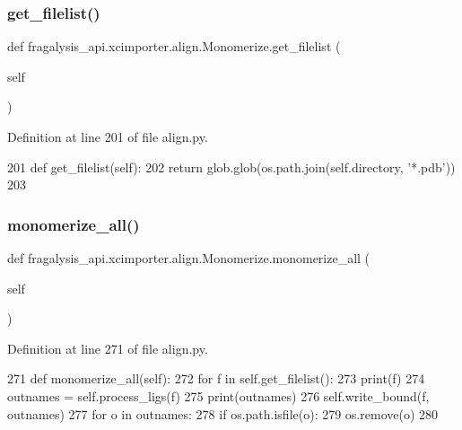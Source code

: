 \subsubsection{\texorpdfstring{get\+\_\+filelist()}{get\_filelist()}}
{\footnotesize\ttfamily def fragalysis\+\_\+api.\+xcimporter.\+align.\+Monomerize.\+get\+\_\+filelist (\begin{DoxyParamCaption}\item[{}]{self }\end{DoxyParamCaption})}



Definition at line 201 of file align.\+py.


\begin{DoxyCode}
201     \textcolor{keyword}{def }get\_filelist(self):
202         \textcolor{keywordflow}{return} glob.glob(os.path.join(self.directory, \textcolor{stringliteral}{'*.pdb'}))
203 
\end{DoxyCode}
\mbox{\label{classfragalysis__api_1_1xcimporter_1_1align_1_1_monomerize_a2418993e78b9269ecc5d4222a142261c}} 
\subsubsection{\texorpdfstring{monomerize\+\_\+all()}{monomerize\_all()}}
{\footnotesize\ttfamily def fragalysis\+\_\+api.\+xcimporter.\+align.\+Monomerize.\+monomerize\+\_\+all (\begin{DoxyParamCaption}\item[{}]{self }\end{DoxyParamCaption})}



Definition at line 271 of file align.\+py.


\begin{DoxyCode}
271     \textcolor{keyword}{def }monomerize\_all(self):
272         \textcolor{keywordflow}{for} f \textcolor{keywordflow}{in} self.get\_filelist():
273             print(f)
274             outnames = self.process\_ligs(f)
275             print(outnames)
276             self.write\_bound(f, outnames)
277             \textcolor{keywordflow}{for} o \textcolor{keywordflow}{in} outnames:
278                 \textcolor{keywordflow}{if} os.path.isfile(o):
279                     os.remove(o)
280 \end{DoxyCode}
\mbox{\label{classfragalysis__api_1_1xcimporter_1_1align_1_1_monomerize_a182c0cf1af3303f6c13d5160c6c0ff8e}} 
